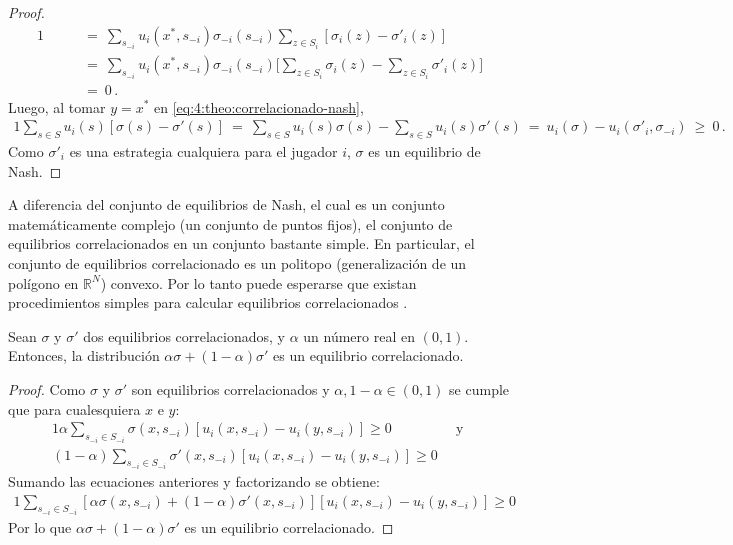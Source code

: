 \begin{proof}
\begin{alignat}{1}
    &\qquad=\ \sum_{s_{-i}} u_i(x^*,s_{-i}) \sigma_{-i}(s_{-i}) \sum_{z\in S_i} [\sigma_i(z) - \sigma'_i(z)] \\
    &\qquad=\ \sum_{s_{-i}} u_i(x^*,s_{-i}) \sigma_{-i}(s_{-i}) \biggl[ \sum_{z\in S_i} \sigma_i(z) - \sum_{z\in S_i} \sigma'_i(z) \biggr] \\
    &\qquad=\ 0 \,.
\end{alignat}
Luego, al tomar $y=x^*$ en \eqref{eq:4:theo:correlacionado-nash},
\begin{alignat}{1}
 \sum_{s \in S} u_i(s) [\sigma(s) - \sigma'(s)]\ =\ \sum_{s \in S} u_i(s)\sigma(s) - \sum_{s \in S} u_i(s)\sigma'(s)\ =\ u_i(\sigma) - u_i(\sigma'_i, \sigma_{-i})\ \geq\ 0 \,.
\end{alignat}
Como $\sigma'_i$ es una estrategia cualquiera para el jugador $i$, $\sigma$ es un equilibrio de Nash.
\end{proof}

A diferencia del conjunto de equilibrios de Nash, el cual es un conjunto matemáticamente complejo (un conjunto de puntos fijos), el conjunto de equilibrios correlacionados en un conjunto bastante simple. En particular, el conjunto de equilibrios correlacionado es un politopo (generalización de un polígono en $\mathbb{R}^N$) convexo. Por lo tanto puede esperarse que existan procedimientos simples para calcular equilibrios correlacionados \cite{bib:correlated-equilibrium}.

\begin{theorem}
Sean $\sigma$ y $\sigma'$ dos equilibrios correlacionados, y $\alpha$ un número real en $(0,1)$. Entonces, la distribución $\alpha\sigma + (1-\alpha)\sigma'$ es un equilibrio correlacionado.
\end{theorem}
\begin{proof}
Como $\sigma$ y $\sigma'$ son equilibrios correlacionados y $\alpha, 1 - \alpha \in (0, 1)$ se cumple que para cualesquiera $x$ e $y$:
\begin{alignat}{1}
 \alpha \sum_{s_{-i} \in S_{-i}} \sigma(x, s_{-i})[u_i(x, s_{-i}) - u_i(y, s_{-i})] \geq 0 & \, \text{ y } \\
 (1 - \alpha) \sum_{s_{-i} \in S_{-i}} \sigma'(x, s_{-i})[u_i(x, s_{-i}) - u_i(y, s_{-i})] \geq 0
\end{alignat}
Sumando las ecuaciones anteriores y factorizando se obtiene:
\begin{alignat}{1}
 \sum _{s_{-i} \in S_{-i}} [ \alpha \sigma(x, s_{-i}) +  (1 - \alpha) \sigma'(x, s_{-i})][u_i(x, s_{-i}) - u_i(y, s_{-i})] \geq 0
\end{alignat}
Por lo que $\alpha \sigma +  (1 - \alpha) \sigma'$ es un equilibrio correlacionado.
\end{proof}

